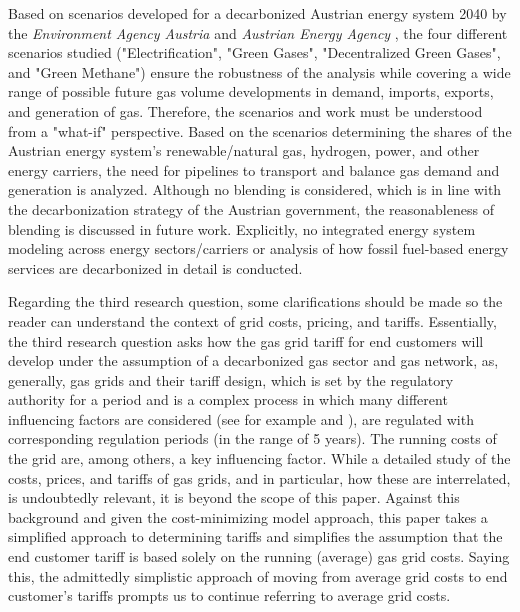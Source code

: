 Based on scenarios developed for a decarbonized Austrian energy system 2040 by the \textit{Environment Agency Austria} \cite{umweltbundesamt} and \textit{Austrian Energy Agency} \cite{Energieagentur}, the four different scenarios studied ("Electrification", "Green Gases", "Decentralized Green Gases", and "Green Methane") ensure the robustness of the analysis while covering a wide range of possible future gas volume developments in demand, imports, exports, and generation of gas. Therefore, the scenarios and work must be understood from a "what-if" perspective. Based on the scenarios determining the shares of the Austrian energy system's renewable/natural gas, hydrogen, power, and other energy carriers, the need for pipelines to transport and balance gas demand and generation is analyzed. Although no blending is considered, which is in line with the decarbonization strategy of the Austrian government, the reasonableness of blending is discussed in future work. Explicitly, no integrated energy system modeling across energy sectors/carriers or analysis of how fossil fuel-based energy services are decarbonized in detail is conducted.\vspace{0.3cm}

Regarding the third research question, some clarifications should be made so the reader can understand the context of grid costs, pricing, and tariffs. Essentially, the third research question asks how the gas grid tariff for end customers will develop under the assumption of a decarbonized gas sector and gas network, as, generally, gas grids and their tariff design, which is set by the regulatory authority for a period and is a complex process in which many different influencing factors are considered (see for example \cite{chen2020dynamic} and \cite{klein1993comparison}), are regulated with corresponding regulation periods (in the range of 5 years). The running costs of the grid are, among others, a key influencing factor. While a detailed study of the costs, prices, and tariffs of gas grids, and in particular, how these are interrelated, is undoubtedly relevant, it is beyond the scope of this paper. Against this background and given the cost-minimizing model approach, this paper takes a simplified approach to determining tariffs and simplifies the assumption that the end customer tariff is based solely on the running (average) gas grid costs. Saying this, the admittedly simplistic approach of moving from average grid costs to end customer's tariffs prompts us to continue referring to average grid costs.\vspace{0.3cm}  


